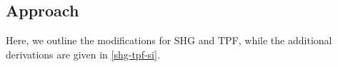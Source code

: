 \documentclass[../../main.tex]{subfiles}
\begin{document}
\begin{refsection}







	\section{Approach}

	Here, we outline the modifications for SHG and TPF, while the additional derivations are given in \cref{shg-tpf-si}.


\end{refsection}
\end{document}
